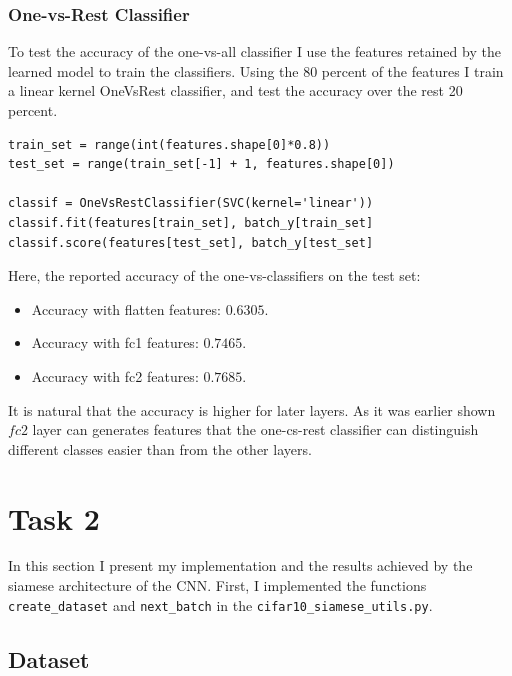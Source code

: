 \documentclass{article}
\begin{document}
\subsubsection{One-vs-Rest Classifier}


To test the accuracy of the one-vs-all classifier I use the features retained by the learned model to train the classifiers.
Using the 80 percent of the features I train a linear kernel OneVsRest classifier, and test the accuracy over the rest 20 percent.
\begin{verbatim}
train_set = range(int(features.shape[0]*0.8))
test_set = range(train_set[-1] + 1, features.shape[0])

classif = OneVsRestClassifier(SVC(kernel='linear'))
classif.fit(features[train_set], batch_y[train_set]
classif.score(features[test_set], batch_y[test_set]
\end{verbatim}
Here, the reported accuracy of the one-vs-classifiers on the test set:
\begin{itemize}
\item Accuracy with flatten features: $0.6305$.
\item Accuracy with fc1 features: $0.7465$.
\item Accuracy with fc2 features: $\mathbf{0.7685}$.
\end{itemize}
It is natural that the accuracy is higher for later layers.
As it was earlier shown $fc2$ layer can generates features that the one-cs-rest classifier can distinguish different classes easier than from the other layers.




\section{Task 2}

In this section I present my implementation and the results achieved by the siamese architecture of the CNN.		
First, I implemented the functions \texttt{create\_dataset} and \texttt{next\_batch} in the \texttt{cifar10\_siamese\_utils.py}.


\subsection{Dataset}
\end{document}
